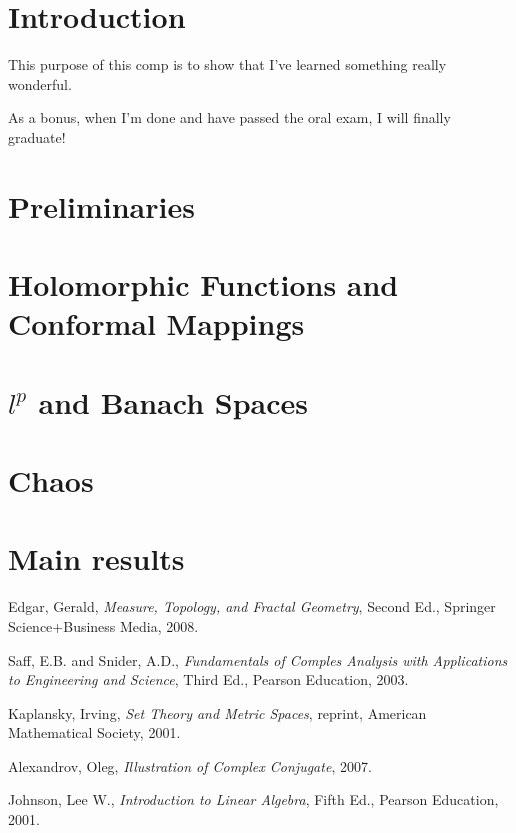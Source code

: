 \documentclass[11pt]{article}
\theoremstyle{plain}
\theoremstyle{definition}
\begin{document}
\newpage
\doublespacing
\setcounter{page}{1}
\section{Introduction}

This purpose of this comp is to show that I've learned something really wonderful.

As a bonus, when I'm done and have passed the oral exam, I will finally graduate!

\newpage
\section{Preliminaries}


\newpage
\section{Holomorphic Functions and Conformal Mappings}


\newpage
\section{$l^p$ and Banach Spaces}


\newpage
\section{Chaos}


\newpage
\section{Main results}



\newpage  
\begin{thebibliography}{99}
\singlespacing
{} Edgar, Gerald, \emph{Measure, Topology, and Fractal Geometry}, Second Ed., Springer Science+Business Media, 2008.

 Saff, E.B. and Snider, A.D., \emph{Fundamentals of Comples Analysis with Applications to Engineering and Science}, Third Ed., Pearson Education, 2003.

 Kaplansky, Irving, \emph{Set Theory and Metric Spaces}, reprint, American Mathematical Society, 2001.

 Alexandrov, Oleg, \emph{Illustration of Complex Conjugate}, 2007.

 Johnson, Lee W., \emph{Introduction to Linear Algebra}, Fifth Ed., Pearson Education, 2001.

\end{thebibliography}

\end{document}
